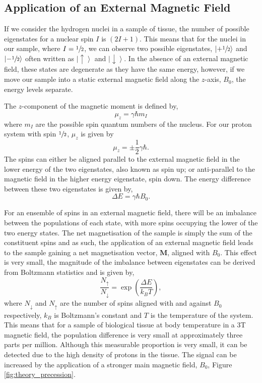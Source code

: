 \subsection{Application of an External Magnetic Field}
If we consider the hydrogen nuclei in a sample of tissue, the number of possible eigenstates for a nuclear spin $I$ is $\left(2I + 1\right)$. This means that for the  nuclei in our sample, where $I=\sfrac{1}{2}$, we can observe two possible eigenstates, $\left| + \sfrac{1}{2} \right \rangle$ and $\left| - \sfrac{1}{2} \right \rangle$ often written as $\left|  \uparrow \right \rangle$ and $\left|  \downarrow \right \rangle$. In the absence of an external magnetic field, these states are degenerate as they have the same energy, however, if we move our sample into a static external magnetic field along the $z$-axis, $B_0$, the energy levels separate.

The $z$-component of the magnetic moment is defined by,
\begin{equation}
\mu_z=\gamma \hbar m_I
\label{eq:theory_longitudinal_magnetic_moment}
\end{equation}
where $m_I$ are the possible spin quantum numbers of the nucleus. For our proton system with spin $\sfrac{1}{2}$, $\mu_z$ is given by
\begin{equation}
\mu_z = \pm \frac{1}{2}\gamma\hbar.
\end{equation}
The spins can either be aligned parallel to the external magnetic field in the lower energy of the two eigenstates, also known as spin up; or anti-parallel to the magnetic field in the higher energy eigenstate, spin down. The energy difference between these two eigenstates is given by,
\begin{equation}
\Delta E = \gamma \hbar B_0.
\label{eq:theory_zeeman}
\end{equation}

For an ensemble of spins in an external magnetic field, there will be an imbalance between the populations of each state, with more spins occupying the lower of the two energy states. The net magnetisation of the sample is simply the sum of the constituent spins and as such, the application of an external magnetic field leads to the sample gaining a net magnetisation vector, $\mathbf{M}$, aligned with $B_0$. This effect is very small, the magnitude of the imbalance between eigenstates can be derived from Boltzmann statistics and is given by,
\begin{equation}
\frac{N_{\uparrow}}{N_{\downarrow}} = \exp \left(\frac{\Delta E}{k_B T}\right),
\label{eq:theory_boltzman}
\end{equation}
where $N_{\downarrow}$ and $N_{\uparrow}$ are the number of spins aligned with and against $B_0$ respectively, $k_B$ is Boltzmann's constant and $T$ is the temperature of the system. This means that for a sample of biological tissue at body temperature in a 3T magnetic field, the population difference is very small at approximately three parts per million. Although this measurable proportion is very small, it can be detected due to the high density of protons in the tissue. The signal can be increased by the application of a stronger main magnetic field, $B_0$, Figure \ref{fig:theory_precession}.

